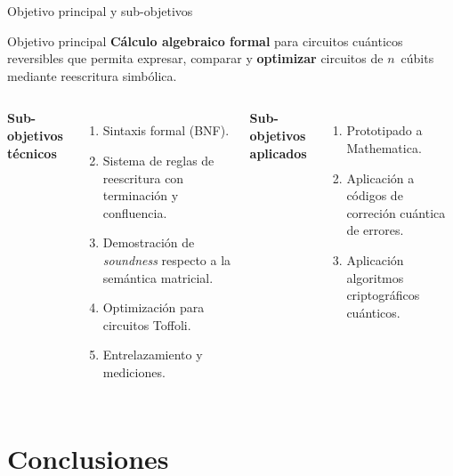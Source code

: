 \documentclass[12pt, aspectratio=169]{beamer}
\begin{document}
\begin{frame}{Objetivo principal y sub-objetivos}
  \begin{block}{Objetivo principal}
    \small
    \textbf{Cálculo algebraico formal} para circuitos cuánticos
    reversibles que permita expresar, comparar y \textbf{optimizar}
    circuitos de $n$~cúbits mediante reescritura simbólica.
  \end{block}

  \medskip
  \begin{columns}[T]
    \textbf{Sub-objetivos técnicos}
    \begin{enumerate}\small
      \item[\textbf{O1}] Sintaxis formal (BNF).
      \item[\textbf{O2}] Sistema de reglas de reescritura con terminación
            y confluencia.
      \item[\textbf{O3}] Demostración de \emph{soundness} respecto a la
            semántica matricial.
      \item[\textbf{O4}] Optimización para circuitos Toffoli.
      \item[\textbf{O5}] Entrelazamiento y mediciones.
    \end{enumerate}

    \textbf{Sub-objetivos aplicados}
    \begin{enumerate}\small
      \item[\textbf{O6}] Prototipado a Mathematica.
      \item[\textbf{O7}] Aplicación a códigos de correción cuántica de errores.
      \item[\textbf{O8}] Aplicación algoritmos criptográficos cuánticos.
    \end{enumerate}
  \end{columns}
\end{frame}


\section{Conclusiones}
\end{document}
